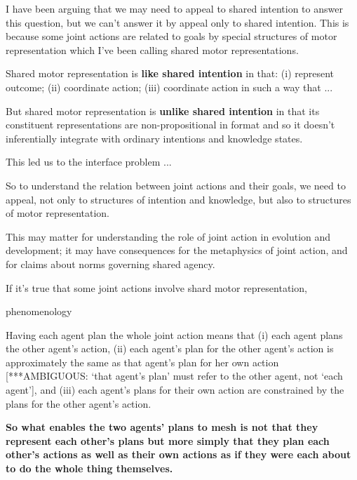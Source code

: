\documentclass[12pt,\papersize]{extarticle}
\begin{document}
I have been arguing that we may need to appeal to shared intention to answer this question,
but we can't answer it by appeal only to shared intention.
This is because some joint actions are related to goals by special structures of motor representation which I've been calling shared motor representations.

Shared motor representation is \textbf{like shared intention} in that: (i) represent outcome; (ii) coordinate action; (iii) coordinate action in such a way that ...

But  shared motor representation is \textbf{unlike shared intention} in that its constituent representations are non-propositional in format and so it doesn't inferentially integrate with ordinary intentions and knowledge states.

This led us to the interface problem ...

So to understand the relation between joint actions and their goals, we need to appeal, 	
	not only to structures of intention and knowledge,
	but also to structures of motor representation.

This may matter for understanding the role of joint action in evolution and development;
it may have consequences  for the metaphysics of joint action, and for claims about norms governing shared agency.

If it's true that some joint actions involve shard motor representation,


 phenomenology



Having each agent plan the whole joint action means that (i) each agent plans the other agent's action,
(ii) each agent's plan for the other agent's action is approximately the same as that agent's plan for her own action [***AMBIGUOUS: `that agent's plan' must refer to the other agent, not `each agent'],
and 
(iii) each  agent's plans for their own action are constrained by the plans for the other agent's action.

\textbf{So what enables the two agents' plans to mesh is not that they represent each other's plans but more simply that they plan each other's actions as well as their own actions as if they were each about to do the whole thing themselves.}
\end{document}
